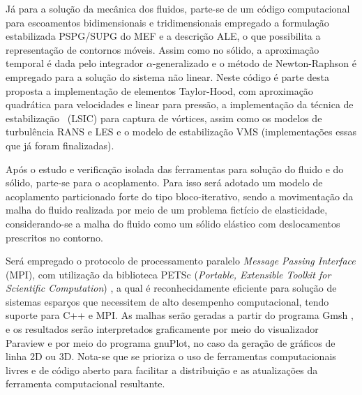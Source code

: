 Já para a solução da mecânica dos fluidos, parte-se de um código computacional para escoamentos bidimensionais e tridimensionais empregado a formulação estabilizada PSPG/SUPG do MEF e a descrição ALE, o que possibilita a representação de contornos móveis. Assim como no sólido, a aproximação temporal é dada pelo integrador $\alpha$-generalizado e o método de Newton-Raphson é empregado para a solução do sistema não linear. Neste código é parte desta proposta a implementação de elementos Taylor-Hood, com aproximação quadrática para velocidades e linear para pressão, a implementação da técnica de estabilização \LSIC\ (LSIC) para captura de vórtices, assim como os modelos de turbulência RANS e LES e o modelo de estabilização VMS (implementações essas que já foram finalizadas).

Após o estudo e verificação isolada das ferramentas para solução do fluido e do sólido, parte-se para o acoplamento.
Para isso será adotado um modelo de acoplamento particionado forte do tipo bloco-iterativo, sendo a movimentação da malha do fluido realizada por meio de um problema fictício de elasticidade, considerando-se a malha do fluido como um sólido elástico com deslocamentos prescritos no contorno.




Será empregado o protocolo de processamento paralelo \textit{Message Passing Interface} (MPI), com utilização da biblioteca PETSc (\textit{Portable, Extensible Toolkit for Scientific Computation}) \cite{petsc-web-page}, a qual é reconhecidamente eficiente para solução de sistemas esparços que necessitem de alto desempenho computacional, tendo suporte para C++ e MPI.  As malhas serão geradas a partir do programa Gmsh \cite{geuzaine2009gmsh}, e os resultados serão interpretados graficamente por meio do visualizador Paraview \cite{ahrens2005paraview} e por meio do programa gnuPlot, no caso da geração de gráficos de linha 2D ou 3D. Nota-se que se prioriza o uso de ferramentas computacionais livres e de código aberto para facilitar a distribuição e as atualizações da ferramenta computacional resultante.


